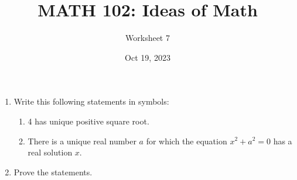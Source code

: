 \documentclass[12pt]{amsart}
\title{ MATH 102: Ideas  of Math }
\author{ Worksheet 7 }
\date{Oct 19, 2023}
\begin{document}
\maketitle

\begin{problem}
    \begin{enumerate}
        \item Write this following statements in symbols:

            \begin{enumerate}
                \item 4 has unique positive square root.
                \item There is a  unique real number $a$ for which the equation $x^2 + a^2 = 0$ has
                    a real solution $x$.
            \end{enumerate}

\item Prove the statements. 


    \end{enumerate}
\end{problem}
\end{document}
